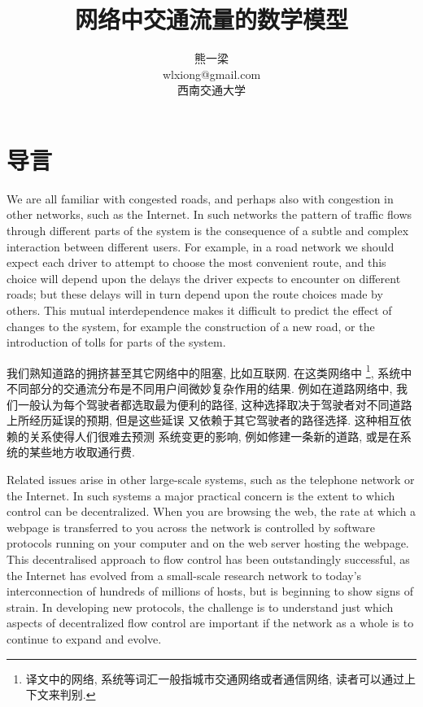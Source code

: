 \documentclass[a4paper,12pt, twocolumn]{article}
\begin{document}
\title{网络中交通流量的数学模型}
\author{熊一梁\\wlxiong@gmail.com\\ 西南交通大学 }
\date{}

\maketitle


\section{导言}

We are all familiar with congested roads, and 
perhaps also with congestion in other networks,
such as the Internet.  In such networks 
the pattern of traffic flows through different parts 
of the system is the consequence of a subtle and 
complex interaction between different users.
For example, in a road network
we should expect each driver to attempt to choose 
the most convenient route, and this choice 
will depend upon the delays the driver expects to encounter
on different roads; but these delays will in turn 
depend upon the route choices made by others. 
This mutual interdependence makes it difficult to 
predict the effect of changes to the system, for example
the construction of a new road, or  the introduction
of tolls for parts of the system.

我们熟知道路的拥挤甚至其它网络中的阻塞, 比如互联网. 在这类网络中
\footnote{译文中的网络, 系统等词汇一般指城市交通网络或者通信网络, 
读者可以通过上下文来判别. }, 
系统中不同部分的交通流分布是不同用户间微妙复杂作用的结果. 
例如在道路网络中, 我们一般认为每个驾驶者都选取最为便利的路径, 
这种选择取决于驾驶者对不同道路上所经历延误的预期, 但是这些延误
又依赖于其它驾驶者的路径选择. 这种相互依赖的关系使得人们很难去预测
系统变更的影响, 例如修建一条新的道路, 或是在系统的某些地方收取通行费. 

Related issues arise in other large-scale systems,
such as the telephone network or the Internet. 
In such  systems a major practical concern is
the extent to which control can be decentralized.
When you are browsing the web, the rate at which a
webpage is transferred to you across the network is 
controlled by software protocols running on your computer
and on the web server hosting the webpage. This 
decentralised approach to flow control has been
outstandingly successful, as the Internet has
evolved from a small-scale research network to 
today's interconnection of hundreds of millions
of hosts, but is beginning to show signs of strain.
In developing new protocols, 
the challenge is to understand just which aspects of 
decentralized flow control are important if
the network as a whole is to continue to expand
and evolve.
\end{document}
